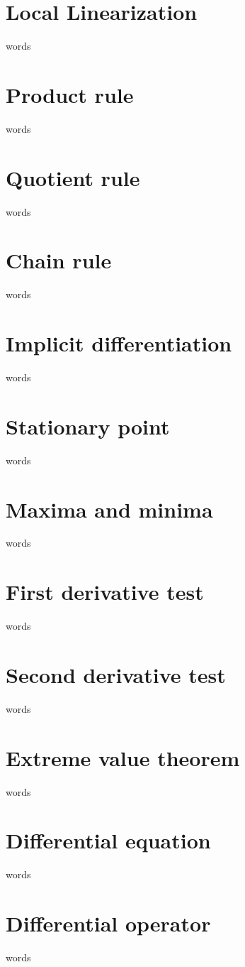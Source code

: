 \section{Local Linearization}
words


\section{Product rule}
words

\section{Quotient rule}
words

\section{Chain rule}
words

\section{Implicit differentiation}
words

\section{Stationary point}
words

\section{Maxima and minima}
words

\section{First derivative test}
words

\section{Second derivative test}
words


\section{Extreme value theorem}
words

\section{Differential equation}
words

\section{Differential operator}
words

